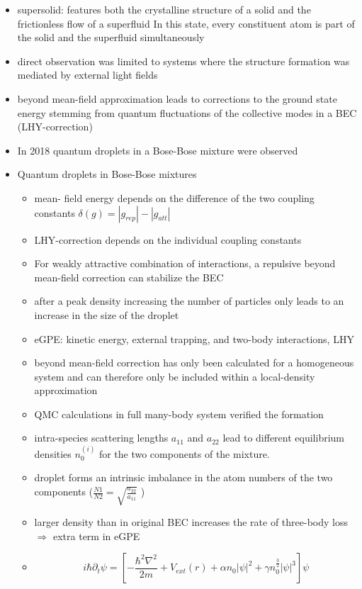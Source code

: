 \begin{itemize}
    \item supersolid: features both the crystalline structure of a solid and the frictionless flow of a superfluid
In this state, every constituent atom is part of the solid and the superfluid simultaneously
    \item direct observation was limited to systems where the structure formation was mediated by external light fields
    \item beyond mean-field approximation leads to corrections to the ground
state energy stemming from quantum fluctuations of the collective modes in a BEC (LHY-correction)
    \item In 2018 quantum droplets in a Bose-Bose mixture were observed

    \item Quantum droplets in Bose-Bose mixtures
    \begin{itemize}
        \item mean- field energy depends on the difference of the two coupling constants $\delta(g) = |g_{rep}| - |g_{att}|$ \item LHY-correction depends on the individual coupling constants
        \item For weakly attractive combination of interactions, a repulsive beyond mean-field correction can stabilize the BEC
        \item after a peak density increasing the number of particles only leads to an increase in the
    size of the droplet
        \item eGPE: kinetic energy, external trapping, and two-body interactions, LHY
        \item beyond mean-field correction has only been calculated for a homogeneous system and can therefore only be included within a local-density approximation
        \item QMC calculations in full many-body system verified the formation
        \item intra-species scattering lengths $a_{11}$ and $a_{22}$ lead to different equilibrium densities $n^{(i)}_{0}$ for the two components of the mixture.
        \item droplet forms an intrinsic imbalance in the atom numbers of the two components ($\frac{N1}{N2} = \sqrt{\frac{a_{22}}{a_{11}}}$ )
        \item larger density than in original BEC increases the rate of three-body loss $\Rightarrow$ extra term in eGPE
        \item[]
            \begin{equation}
              i \hbar \partial_{t} \psi = \left[ - \frac{\hbar^{2} \nabla^{2}}{2 m} + V_{ext}(r) + \alpha n_{0} |\psi|^{2} + \gamma n_{0}^{\frac{3}{2}} |\psi|^{3} \right] \psi
            \end{equation}
    \end{itemize}
\end{itemize}

